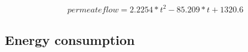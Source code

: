 \begin{equation}
permeate flow =  2.2254*t^2-85.209*t+1320.6
\end{equation}

\subsection{Energy consumption}








